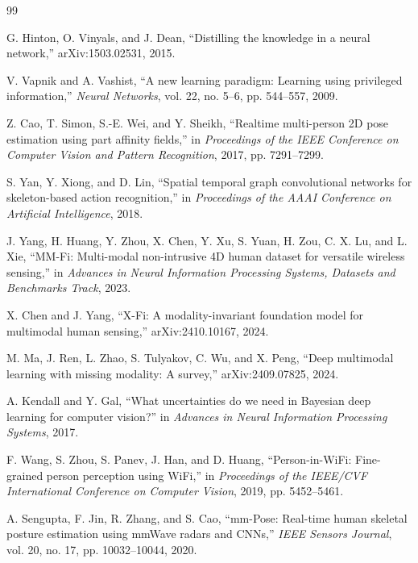 \documentclass[preprint,12pt]{elsarticle}
\begin{document}
\begin{thebibliography}{99}

G. Hinton, O. Vinyals, and J. Dean, ``Distilling the knowledge in a neural network,'' arXiv:1503.02531, 2015.

V. Vapnik and A. Vashist, ``A new learning paradigm: Learning using privileged information,'' \emph{Neural Networks}, vol. 22, no. 5--6, pp. 544--557, 2009.

Z. Cao, T. Simon, S.-E. Wei, and Y. Sheikh, ``Realtime multi-person 2D pose estimation using part affinity fields,'' in \emph{Proceedings of the IEEE Conference on Computer Vision and Pattern Recognition}, 2017, pp. 7291--7299.

S. Yan, Y. Xiong, and D. Lin, ``Spatial temporal graph convolutional networks for skeleton-based action recognition,'' in \emph{Proceedings of the AAAI Conference on Artificial Intelligence}, 2018.

J. Yang, H. Huang, Y. Zhou, X. Chen, Y. Xu, S. Yuan, H. Zou, C. X. Lu, and L. Xie, ``MM-Fi: Multi-modal non-intrusive 4D human dataset for versatile wireless sensing,'' in \emph{Advances in Neural Information Processing Systems, Datasets and Benchmarks Track}, 2023.

X. Chen and J. Yang, ``X-Fi: A modality-invariant foundation model for multimodal human sensing,'' arXiv:2410.10167, 2024.

M. Ma, J. Ren, L. Zhao, S. Tulyakov, C. Wu, and X. Peng, ``Deep multimodal learning with missing modality: A survey,'' arXiv:2409.07825, 2024.

A. Kendall and Y. Gal, ``What uncertainties do we need in Bayesian deep learning for computer vision?'' in \emph{Advances in Neural Information Processing Systems}, 2017.

F. Wang, S. Zhou, S. Panev, J. Han, and D. Huang, ``Person-in-WiFi: Fine-grained person perception using WiFi,'' in \emph{Proceedings of the IEEE/CVF International Conference on Computer Vision}, 2019, pp. 5452--5461.

A. Sengupta, F. Jin, R. Zhang, and S. Cao, ``mm-Pose: Real-time human skeletal posture estimation using mmWave radars and CNNs,'' \emph{IEEE Sensors Journal}, vol. 20, no. 17, pp. 10032--10044, 2020.


\end{thebibliography}
\end{document}
